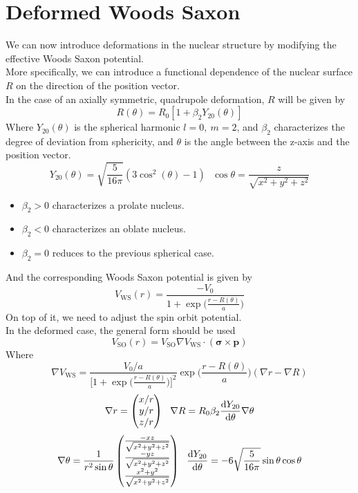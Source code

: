 \section{Deformed Woods Saxon}
We can now introduce deformations in the nuclear structure by modifying the effective Woods Saxon potential.
\\More specifically, we can introduce a functional dependence of the nuclear surface $R$ on the direction of the position vector.
\\In the case of an axially symmetric, quadrupole deformation, $R$ will be given by
\begin{equation}
    R(\theta) = R_0 [1+\beta_2 Y_{20}(\theta)]
\end{equation}
Where $Y_{20}(\theta)$ is the spherical harmonic $l=0, \ m=2$, and $\beta_2$ characterizes the degree of deviation from sphericity, and $\theta$ is the angle between the z-axis and the position vector.
\[ Y_{20}(\theta) = \sqrt{\frac{5}{16\pi}}(3\cos^2(\theta)-1)\ \ \   \cos\theta = \frac{z}{\sqrt{x^2+y^2+z^2}}\]
\begin{itemize}
    \item $\beta_2 > 0$ characterizes a prolate nucleus.
    \item $\beta_2 < 0$ characterizes an oblate nucleus.
    \item $\beta_2 = 0$ reduces to the previous spherical case.
\end{itemize}
And the corresponding Woods Saxon potential is given by
\begin{equation}
    V_{\text{WS}}(r) = \frac{-V_0}{1+\exp\bigg(\frac{r-R(\theta)}{a}\bigg)}
\end{equation}
On top of it, we need to adjust the spin orbit potential.
\\In the deformed case, the general form should be used
\begin{equation}
    V_\text{SO}(r) = V_\text{SO} \nabla V_{\text{WS}}\cdot (\bm{\sigma}\times \bm{p})
\end{equation}
Where 
\begin{equation}
    \nabla V_{\text{WS}} = \frac{V_0/a}{\bigg[1+\exp\bigg(\frac{r-R(\theta)}{a}\bigg)\bigg]^2}\exp\bigg(\frac{r-R(\theta)}{a}\bigg)(\nabla r - \nabla R)
\end{equation}
\begin{equation}
    \nabla r = \begin{pmatrix}
               x/r \\ y/r \\ z/r
    \end{pmatrix}
    \ \ \nabla R = R_0\beta_2\dv{Y_{20}}{\theta}\nabla \theta
\end{equation}
\begin{equation}
    \nabla \theta =\frac{1}{r^2\sin\theta} \begin{pmatrix}
               \frac{-xz}{\sqrt{x^2+y^2+z^2}} \\ \frac{-yz}{\sqrt{x^2+y^2+z^2}} \\ \frac{x^2+y^2}{\sqrt{x^2+y^2+z^2}}
    \end{pmatrix}\ \ \dv{Y_{20}}{\theta} = -6\sqrt{\frac{5}{16\pi}}\sin\theta\cos\theta
\end{equation}


